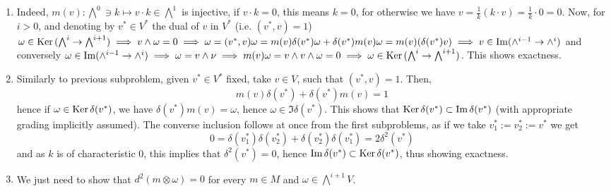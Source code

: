 \documentclass[8pt,fleqn]{article} %
\newcommand{\Ker}{\mbox{\normalfont Ker\,}}
\begin{document}
\begin{enumerate}[label=\bfseries Problem \arabic*.]
\begin{enumerate}[label=(\arabic*).]
\item Indeed, $m(v):\bigwedge^0\ni k\mapsto v\cdot k\in\bigwedge^1$ is injective, if $v\cdot k=0$, this means $k=0$, for otherwise we have
$v=\frac{1}{k}(k\cdot v)=\frac{1}{k}\cdot 0=0$. Now, for $i>0$, and denoting by $v^*\in V^*$ the dual of $v$ in $V^*$ (i.e. $(v^*,v)=1$)
$\omega\in\Ker(\bigwedge^i\to\bigwedge^{i+1})\implies v\wedge\omega=0\implies \omega=(v^*,v)\omega=m(v)\delta(v^*)\omega+\delta(v^*)m(v)\omega=
m(v)(\delta(v^*)v)\implies v\in\Im(\wedge^{i-1}\to\wedge^i)$ and conversely $\omega\in\Im(\wedge^{i-1}\to\wedge^i)\implies\omega=v\wedge\nu\implies
m(v)\omega=v\wedge v\wedge\omega=0\implies\omega\in\Ker(\bigwedge^i\to\bigwedge^{i+1})$. This shows exactness.
\item Similarly to previous subproblem, given $v^*\in V^*$ fixed, take $v\in V$, such that $(v^*,v)=1$. Then,
	\[m(v)\delta(v^*)+\delta(v^*)m(v)=1\]
	hence if $\omega\in\Ker\delta(v^*)$, we have $\delta(v^*)m(v)=\omega$, hence $\omega\in\Im\delta(v^*)$. This shows that $\Ker\delta(v^*)
	\subset\Im\delta(v^*)$ (with appropriate grading implicitly assumed). The converse inclusion follows at once from the first subproblems,
	as if we take $v_1^*:=v_2^*:=v^*$ we get
	\[0=\delta(v_1^*)\delta(v_2^*)+\delta(v_2^*)\delta(v_1^*)=2\delta^2(v^*)\]
	and as $k$ is of characteristic $0$, this implies that $\delta^2(v^*)=0$, hence $\Im\delta(v^*)\subset\Ker\delta(v^*)$, thus
	showing exactness.
\item We just need to show that $d^2(m\otimes\omega)=0$ for every $m\in M$ and $\omega\in\bigwedge^{i+1}V$.
		\end{enumerate}
\end{enumerate}
\end{document}
